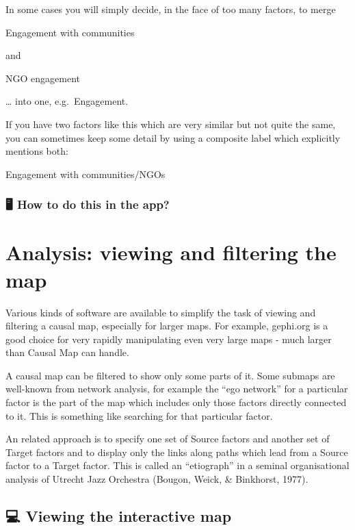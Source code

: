 \documentclass[
]{book}
\begin{document}
In some cases you will simply decide, in the face of too many factors, to merge

Engagement with communities

and

NGO engagement

\ldots{} into one, e.g.~Engagement.

If you have two factors like this which are very similar but not quite the same, you can sometimes keep some detail by using a composite label which explicitly mentions both:

Engagement with communities/NGOs

\hypertarget{how-to-do-this-in-the-app}{%
\subsection{🖥 How to do this in the app?}\label{how-to-do-this-in-the-app}}

\hypertarget{analysis}{%
\chapter{Analysis: viewing and filtering the map}\label{analysis}}

Various kinds of software are available to simplify the task of viewing and filtering a causal map, especially for larger maps. For example, gephi.org is a good choice for very rapidly manipulating even very large maps - much larger than Causal Map can handle.

A causal map can be filtered to show only some parts of it. Some submaps are well-known from network analysis, for example the ``ego network'' for a particular factor is the part of the map which includes only those factors directly connected to it. This is something like searching for that particular factor.

An related approach is to specify one set of Source factors and another set of Target factors and to display only the links along paths which lead from a Source factor to a Target factor. This is called an ``etiograph'' in a seminal organisational analysis of Utrecht Jazz Orchestra (Bougon, Weick, \& Binkhorst, 1977).

\hypertarget{viewing-the-interactive-map}{%
\section{💻 Viewing the interactive map}\label{viewing-the-interactive-map}}
\end{document}
